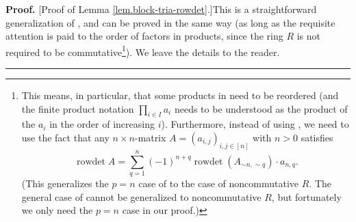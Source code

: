 \documentclass
[numbers=enddot,12pt,final,onecolumn,notitlepage,english]{scrartcl}%
\theoremstyle{definition}
\newenvironment{proof}[1][Proof]{\noindent\textbf{#1.} }{\ \rule{0.5em}{0.5em}}
\let\sumnonlimits\sum
\let\prodnonlimits\prod
\renewcommand{\sum}{\sumnonlimits\limits}
\renewcommand{\prod}{\prodnonlimits\limits}
\newenvironment{vershort}{}{}
\begin{document}
\begin{vershort}
\begin{proof}
[Proof of Lemma \ref{lem.block-tria-rowdet}.]This is a straightforward
generalization of \cite[Exercise 6.29]{detnotes}, and can be proved in the
same way (as long as the requisite attention is paid to the order of factors
in products, since the ring $R$ is not required to be
commutative\footnote{This means, in particular, that some products in
\cite[solution to Exercise 6.29]{detnotes} need to be reordered (and the
finite product notation $\prod_{i\in I}a_{i}$ needs to be understood as the
product of the $a_{i}$ in the order of increasing $i$). Furthermore, instead
of using \cite[Theorem 6.82 \textbf{(a)}]{detnotes}, we need to use the fact
that any $n\times n$-matrix $A=\left(  a_{i,j}\right)  _{i,j\in\left[
n\right]  }$ with $n>0$ satisfies%
\[
\operatorname*{rowdet}A=\sum_{q=1}^{n}\left(  -1\right)  ^{n+q}%
\operatorname*{rowdet}\left(  A_{\sim n,\sim q}\right)  \cdot a_{n,q}.
\]
(This generalizes the $p=n$ case of \cite[Theorem 6.82 \textbf{(a)}]{detnotes}
to the case of noncommutative $R$. The general case of \cite[Theorem 6.82
\textbf{(a)}]{detnotes} cannot be generalized to noncommutative $R$, but
fortunately we only need the $p=n$ case in our proof.)}). We leave the details
to the reader.
\end{proof}
\end{vershort}
\end{document}

